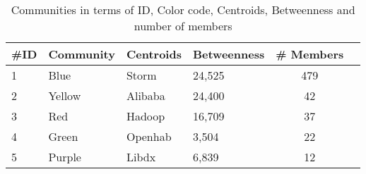 
\begin{table}[]
\centering
\caption{Communities in terms of ID, Color code, Centroids, Betweenness and number of members}
\label{tab:communities}
\begin{tabular}{llllcc}
\#ID               & Community             & Centroids        & Betweenness & \# Members        \\ \hline
1                  & Blue                  & Storm &           24,525 &    479                                      \\ \hline
2                  & Yellow                & Alibaba          & 24,400      & 42                                      \\ \hline
3                  & Red                   & Hadoop           & 16,709      & 37                                      \\ \hline
4                  & Green                 & Openhab          & 3,504       & 22                                      \\ \hline
5                  & Purple                & Libdx              & 6,839       & 12  \\ \hline \hline                               
\end{tabular}
\end{table}
